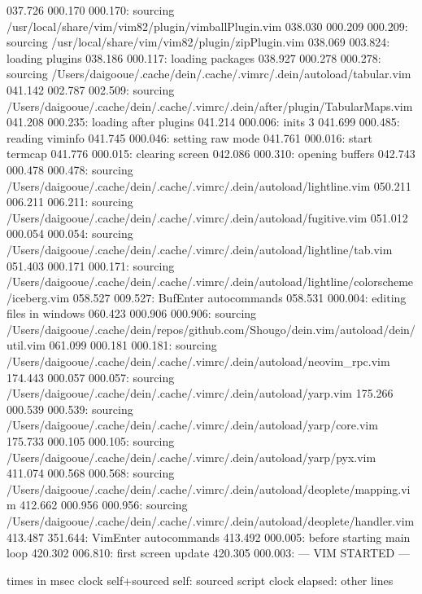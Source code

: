 037.726  000.170  000.170: sourcing /usr/local/share/vim/vim82/plugin/vimballPlugin.vim
038.030  000.209  000.209: sourcing /usr/local/share/vim/vim82/plugin/zipPlugin.vim
038.069  003.824: loading plugins
038.186  000.117: loading packages
038.927  000.278  000.278: sourcing /Users/daigooue/.cache/dein/.cache/.vimrc/.dein/autoload/tabular.vim
041.142  002.787  002.509: sourcing /Users/daigooue/.cache/dein/.cache/.vimrc/.dein/after/plugin/TabularMaps.vim
041.208  000.235: loading after plugins
041.214  000.006: inits 3
041.699  000.485: reading viminfo
041.745  000.046: setting raw mode
041.761  000.016: start termcap
041.776  000.015: clearing screen
042.086  000.310: opening buffers
042.743  000.478  000.478: sourcing /Users/daigooue/.cache/dein/.cache/.vimrc/.dein/autoload/lightline.vim
050.211  006.211  006.211: sourcing /Users/daigooue/.cache/dein/.cache/.vimrc/.dein/autoload/fugitive.vim
051.012  000.054  000.054: sourcing /Users/daigooue/.cache/dein/.cache/.vimrc/.dein/autoload/lightline/tab.vim
051.403  000.171  000.171: sourcing /Users/daigooue/.cache/dein/.cache/.vimrc/.dein/autoload/lightline/colorscheme/iceberg.vim
058.527  009.527: BufEnter autocommands
058.531  000.004: editing files in windows
060.423  000.906  000.906: sourcing /Users/daigooue/.cache/dein/repos/github.com/Shougo/dein.vim/autoload/dein/util.vim
061.099  000.181  000.181: sourcing /Users/daigooue/.cache/dein/.cache/.vimrc/.dein/autoload/neovim_rpc.vim
174.443  000.057  000.057: sourcing /Users/daigooue/.cache/dein/.cache/.vimrc/.dein/autoload/yarp.vim
175.266  000.539  000.539: sourcing /Users/daigooue/.cache/dein/.cache/.vimrc/.dein/autoload/yarp/core.vim
175.733  000.105  000.105: sourcing /Users/daigooue/.cache/dein/.cache/.vimrc/.dein/autoload/yarp/pyx.vim
411.074  000.568  000.568: sourcing /Users/daigooue/.cache/dein/.cache/.vimrc/.dein/autoload/deoplete/mapping.vim
412.662  000.956  000.956: sourcing /Users/daigooue/.cache/dein/.cache/.vimrc/.dein/autoload/deoplete/handler.vim
413.487  351.644: VimEnter autocommands
413.492  000.005: before starting main loop
420.302  006.810: first screen update
420.305  000.003: --- VIM STARTED ---


times in msec
 clock   self+sourced   self:  sourced script
 clock   elapsed:              other lines

